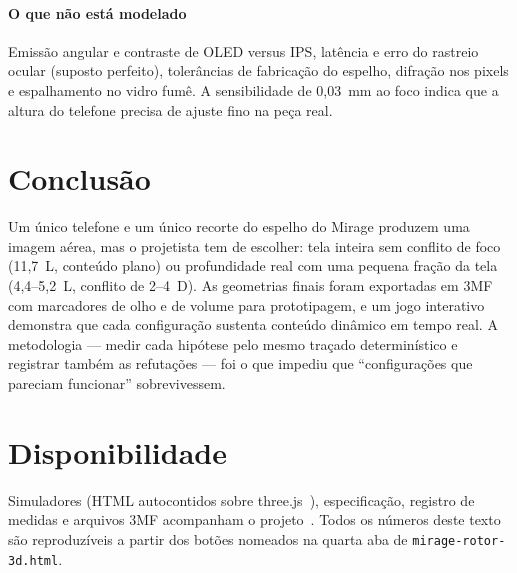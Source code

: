 \documentclass[journal,10pt]{IEEEtran}
\begin{document}
\paragraph{O que n\~ao est\'a modelado} Emiss\~ao angular e contraste de OLED versus IPS, lat\^encia e erro do rastreio ocular (suposto perfeito), toler\^ancias de fabrica\c{c}\~ao do espelho, difra\c{c}\~ao nos pixels e espalhamento no vidro fum\^e. A sensibilidade de 0,03~mm ao foco indica que a altura do telefone precisa de ajuste fino na pe\c{c}a real.

\section{Conclus\~ao}
Um \'unico telefone e um \'unico recorte do espelho do Mirage produzem uma imagem a\'erea, mas o projetista tem de escolher: tela inteira sem conflito de foco (11,7~L, conte\'udo plano) ou profundidade real com uma pequena fra\c{c}\~ao da tela (4,4--5,2~L, conflito de 2--4~D). As geometrias finais foram exportadas em 3MF~\cite{mf3} com marcadores de olho e de volume para prototipagem, e um jogo interativo demonstra que cada configura\c{c}\~ao sustenta conte\'udo din\^amico em tempo real. A metodologia --- medir cada hip\'otese pelo mesmo tra\c{c}ado determin\'istico e registrar tamb\'em as refuta\c{c}\~oes --- foi o que impediu que ``configura\c{c}\~oes que pareciam funcionar'' sobrevivessem.

\section*{Disponibilidade}
Simuladores (HTML autocontidos sobre three.js~\cite{threejs}), especifica\c{c}\~ao, registro de medidas e arquivos 3MF acompanham o projeto~\cite{holosion2026}. Todos os n\'umeros deste texto s\~ao reproduz\'iveis a partir dos bot\~oes nomeados na quarta aba de \texttt{mirage-rotor-3d.html}.



\end{document}
